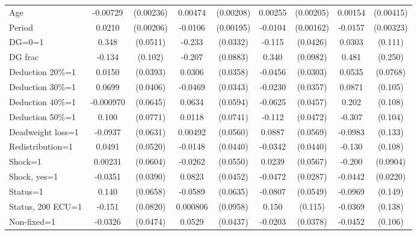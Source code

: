 \begin{tabular}{l|cccccc|cc}
Age             & -0.00729\sym{***}&(0.00236)&  0.00474\sym{**} &(0.00208)&  0.00255         &(0.00205)&  0.00154         &(0.00415)\\
Period          &   0.0210\sym{***}&(0.00206)&  -0.0106\sym{***}&(0.00195)&  -0.0104\sym{***}&(0.00162)&  -0.0157\sym{***}&(0.00323)\\
DG=0=1          &    0.348\sym{***}& (0.0511)&   -0.233\sym{***}& (0.0332)&   -0.115\sym{***}& (0.0426)&   0.0303         &  (0.111)\\
DG frac         &   -0.134         &  (0.102)&   -0.207\sym{**} & (0.0883)&    0.340\sym{***}& (0.0982)&    0.481\sym{*}  &  (0.250)\\
Deduction 20\%=1&   0.0150         & (0.0393)&   0.0306         & (0.0358)&  -0.0456         & (0.0303)&   0.0535         & (0.0768)\\
Deduction 30\%=1&   0.0699\sym{*}  & (0.0406)&  -0.0469         & (0.0343)&  -0.0230         & (0.0357)&   0.0871         &  (0.105)\\
Deduction 40\%=1&-0.000970         & (0.0645)&   0.0634         & (0.0594)&  -0.0625         & (0.0457)&    0.202\sym{*}  &  (0.108)\\
Deduction 50\%=1&    0.100         & (0.0771)&   0.0118         & (0.0741)&   -0.112\sym{**} & (0.0472)&   -0.307\sym{***}&  (0.104)\\
Deadweight loss=1&  -0.0937         & (0.0631)&  0.00492         & (0.0560)&   0.0887         & (0.0569)&  -0.0983         &  (0.133)\\
Redistribution=1&   0.0491         & (0.0520)&  -0.0148         & (0.0440)&  -0.0342         & (0.0440)&   -0.130         &  (0.108)\\
Shock=1         &  0.00231         & (0.0604)&  -0.0262         & (0.0550)&   0.0239         & (0.0567)&   -0.200\sym{**} & (0.0904)\\
Shock, yes=1    &  -0.0351         & (0.0390)&   0.0823\sym{*}  & (0.0452)&  -0.0472         & (0.0287)&  -0.0442\sym{**} & (0.0220)\\
Status=1        &    0.140\sym{**} & (0.0658)&  -0.0589         & (0.0635)&  -0.0807         & (0.0549)&  -0.0969         &  (0.149)\\
Status, 200 ECU=1&   -0.151\sym{*}  & (0.0820)& 0.000806         & (0.0958)&    0.150         &  (0.115)&  -0.0369         &  (0.138)\\
Non-fixed=1     &  -0.0326         & (0.0474)&   0.0529         & (0.0437)&  -0.0203         & (0.0378)&  -0.0452         &  (0.106)\\

\end{tabular}
